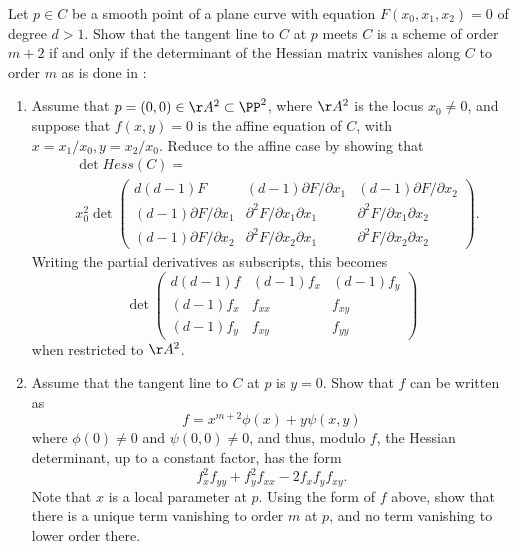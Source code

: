\begin{exercise}\label{Hessian exercise} 
Let $p\in C$ be a smooth point of a  plane curve with equation $F(x_0,x_1,x_2) = 0$ of degree $d>1$. Show that the tangent line to $C$ at $p$ meets
$C$ is a scheme of order $m+2$ if and only if the determinant of the Hessian matrix vanishes
along $C$ to order $m$ as is done in \cite[pp. 84--85]{Kunz}:

\begin{enumerate}
\item Assume that $p = (0,0)\in \AA^2\subset \PP^2$, where $\AA^2$ is the locus $x_0\neq 0$, 
and suppose that $f(x,y) =0$ is the affine equation of $C$, with $x= x_1/x_0, y = x_2/x_0$.
Reduce to the affine case by showing that
$$
\begin{aligned}
&\det Hess(C) = \\
&x_0^2 \det 
\begin{pmatrix}
 d(d-1)F & (d-1) \partial F/\partial x_1 & (d-1) \partial F/\partial x_2 \\
 (d-1) \partial F/\partial x_1&\partial^2 F/\partial x_1 \partial x_1 & \partial^2 F/\partial x_1 \partial x_2\\
 (d-1) \partial F/\partial x_2 &\partial^2 F/\partial x_2 \partial x_1 & \partial^2 F/\partial x_2 \partial x_2 
\end{pmatrix} .
\end{aligned}
$$ 
Writing the partial derivatives as subscripts, this becomes
$$
\det \begin{pmatrix}
 d(d-1)f & (d-1) f_x & (d-1) f_y \\
 (d-1) f_x&f_{xx} & f_{xy}\\
 (d-1) f_y &f_{xy} & f_{yy}
\end{pmatrix}
$$ 
when restricted to $\AA^2$.

\item Assume that the tangent line to $C$ at $p$ is $y=0$. Show that $f$ can be written as
$$
f = x^{m+2}\phi(x) +y\psi(x,y)
$$
where $\phi(0) \neq 0$ and $\psi(0,0) \neq 0$, and thus, modulo $f$, the Hessian determinant,
up to a constant factor, 
has the form
$$
f_x^2f_{yy}+f_y^2f_{xx}-2f_xf_yf_{xy}.
$$
Note that $x$ is a local parameter at $p$. Using the form of $f$ above, show that there is a unique term vanishing to order $m$ at $p$,
and no term vanishing to lower order there.
\end{enumerate}
\end{exercise}

